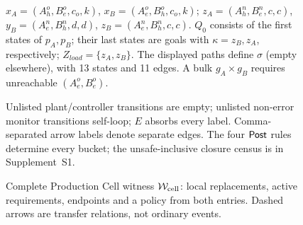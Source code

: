 \begin{figure}[!htbp]
{{\par $x_A=(A_h^o,B_e^o,c_o,k)$, $x_B=(A_e^o,B_h^o,c_o,k)$;
$z_A=(A_h^n,B_e^n,c,c)$, $y_B=(A_e^n,B_h^n,d,d)$, $z_B=(A_e^n,B_h^n,c,c)$.
$Q_0$ consists of the first states of $p_A,p_B$; their last states are goals with $\kappa=z_B,z_A$, respectively; $Z_{load}=\{z_A,z_B\}$.
The displayed paths define $\sigma$ (empty elsewhere), with 13 states and 11 edges. A bulk $g_A\times g_B$ requires unreachable $(A_e^o,B_e^o)$.
\par Unlisted plant/controller transitions are empty; unlisted non-error monitor transitions self-loop; $E$ absorbs every label. Comma-separated arrow labels denote separate edges. The four $\mathsf{Post}$ rules determine every bucket; the unsafe-inclusive closure census is in Supplement~S1.
}}
\caption{Complete Production Cell witness $\mathcal W_{\rm cell}$: local replacements, active requirements, endpoints and a policy from both entries. Dashed arrows are transfer relations, not ordinary events.}
\label{fig:wcell-complete}
\end{figure}

